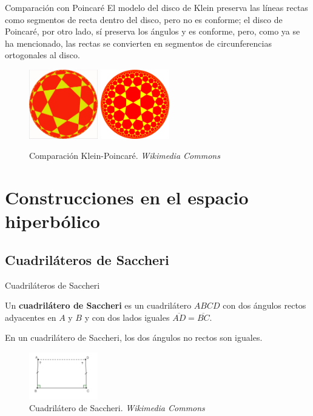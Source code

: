 \documentclass[compress]{beamer}
\begin{document}
\begin{frame}{Comparación con Poincaré}
  El modelo del disco de Klein preserva las líneas rectas como segmentos
  de recta dentro del disco, pero no es conforme; el disco de Poincaré,
  por otro lado, sí preserva los ángulos y es conforme, pero, como ya se
  ha mencionado, las rectas se convierten en segmentos de circunferencias
  ortogonales al disco.

  \begin{figure}[ht!]
    \centering
    \includegraphics[width=30mm]{./klein37.png}
    \quad
    \includegraphics[width=30mm]{./poincare37.png}
    \caption{Comparación Klein-Poincaré. \textit{Wikimedia Commons} \label{kleinpoincare}}
  \end{figure}
\end{frame}


\section{Construcciones en el espacio hiperbólico}
\subsection{Cuadriláteros de Saccheri}
\begin{frame}{Cuadriláteros de Saccheri}
  \begin{definition}
    Un \textbf{cuadrilátero de Saccheri} es un cuadrilátero $ABCD$ con
    dos ángulos rectos adyacentes en $A$ y $B$ y con dos lados iguales
    $\overline{AD} = \overline{BC}$.
  \end{definition}
  \pause

  \begin{theorem}
    En un cuadrilátero de Saccheri, los dos ángulos no rectos son
    iguales.
  \end{theorem}

  \begin{figure}[ht!]
    \centering
    \includegraphics[width=30mm]{./saccheri.png}
    \caption{Cuadrilátero de Saccheri. \textit{Wikimedia Commons} \label{saccheri}}
  \end{figure}
\end{frame}
\end{document}
